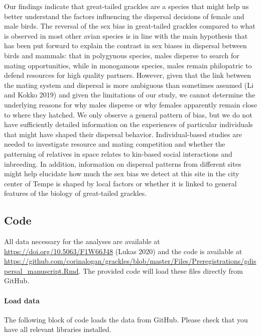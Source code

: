 \documentclass[
]{article}
\begin{document}
Our findings indicate that great-tailed grackles are a species that
might help us better understand the factors influencing the dispersal
decisions of female and male birds. The reversal of the sex bias in
great-tailed grackles compared to what is observed in most other avian
species is in line with the main hypothesis that has been put forward to
explain the contrast in sex biases in dispersal between birds and
mammals: that in polygynous species, males disperse to search for mating
opportunities, while in monogamous species, males remain philopatric to
defend resources for high quality partners. However, given that the link
between the mating system and dispersal is more ambiguous than sometimes
assumed (Li and Kokko 2019) and given the limitations of our study, we
cannot determine the underlying reasons for why males disperse or why
females apparently remain close to where they hatched. We only observe a
general pattern of bias, but we do not have sufficiently detailed
information on the experiences of particular individuals that might have
shaped their dispersal behavior. Individual-based studies are needed to
investigate resource and mating competition and whether the patterning
of relatives in space relates to kin-based social interactions and
inbreeding. In addition, information on dispersal patterns from
different sites might help elucidate how much the sex bias we detect at
this site in the city center of Tempe is shaped by local factors or
whether it is linked to general features of the biology of great-tailed
grackles.

\newpage

\hypertarget{code}{%
\subsection{Code}\label{code}}

All data necessary for the analyses are available at
\url{https://doi.org/10.5063/F1W66J48} (Lukas 2020) and the code is
available at
\url{https://github.com/corinalogan/grackles/blob/master/Files/Preregistrations/gdispersal_manuscript.Rmd}.
The provided code will load these files directly from GitHub.

\hypertarget{load-data}{%
\paragraph{Load data}\label{load-data}}

The following block of code loads the data from GitHub. Please check
that you have all relevant libraries installed.
\end{document}
